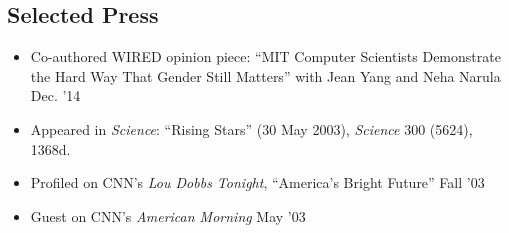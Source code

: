 \documentclass[margin]{res}
\begin{document}
\begin{resume}
%		 
 
\section{Selected Press}
\begin{itemize}[leftmargin=*] \itemsep -2pt
\item Co-authored WIRED opinion piece: ``MIT Computer Scientists Demonstrate the Hard Way That Gender Still Matters'' with Jean Yang and Neha Narula \hfill Dec. '14
\item Appeared in \textit{Science}: ``Rising Stars'' (30 May 2003), \textit{Science} 300 (5624), 1368d.
\item Profiled on CNN's \textit{Lou Dobbs Tonight}, ``America's Bright Future''  \hfill Fall '03 
\item Guest on CNN's \textit{American Morning} \hfill May '03
\end{itemize}


\end{resume}
\end{document}
